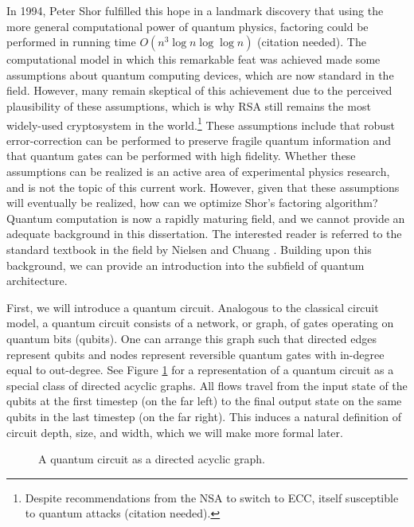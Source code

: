 In 1994, Peter Shor fulfilled this hope in a landmark
discovery that using the more general computational power of quantum physics,
factoring could be performed in running time $O(n^3\log n \log\log n)$ (citation
needed). 
The computational model in which this remarkable feat was achieved
made some assumptions about quantum computing devices, which are now
standard in the field. 
However, many remain skeptical of this achievement due to the perceived
plausibility of these assumptions, which is why RSA still remains the
most widely-used cryptosystem in the world.\footnote{Despite recommendations
from the NSA to switch to ECC, itself susceptible to quantum attacks (citation needed).}
These assumptions include that robust error-correction
can be performed to preserve fragile quantum information and that quantum gates
can be performed with high fidelity. Whether these assumptions can be
realized is an active area of experimental physics research, and is not the
topic of this current work. However, given that these assumptions will
eventually be realized, how can we optimize Shor's factoring algorithm?
Quantum computation is now a rapidly maturing field, and we cannot provide
an adequate background in this dissertation. The interested reader is referred
to the standard textbook in the field by Nielsen and Chuang \cite{Nielsen2000}.
Building upon this background, we can provide an introduction into the subfield
of quantum architecture.

First, we will introduce a quantum circuit.
Analogous to the classical circuit model, a quantum circuit consists of
a network, or graph, of gates operating on quantum bits (qubits). One can
arrange this graph such that directed edges represent qubits and
nodes represent reversible quantum gates with in-degree equal to out-degree.
See Figure \ref{fig:intro-qcirc} for a representation of a quantum circuit
as a special class of directed
acyclic graphs. All flows travel from the input state of the qubits at the
first timestep (on the far
left) to the final output state on the same qubits in the last timestep
(on the far right). This induces a natural definition of circuit depth,
size, and width, which we will make more formal later.

\begin{figure}
\caption{A quantum circuit as a directed acyclic graph.}
\label{fig:intro-qcirc}
\end{figure}

